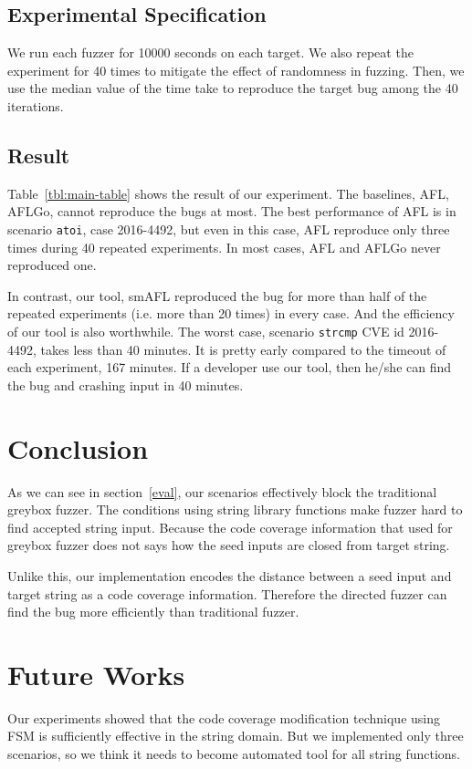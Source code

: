 \documentclass[12pt]{sigplanconf}
\begin{document}
\subsection{Experimental Specification}
We run each fuzzer for 10000 seconds on each target.
We also repeat the experiment for 40 times to mitigate the effect of randomness in fuzzing.
Then, we use the median value of the time take to reproduce the target bug among the 40 iterations.

\subsection{Result}
Table~\ref{tbl:main-table} shows the result of our experiment. The baselines, AFL, AFLGo, cannot reproduce the bugs at most.
The best performance of AFL is in scenario \verb|atoi|, case 2016-4492, but even in this case, AFL reproduce only three
times during 40 repeated experiments. In most cases, AFL and AFLGo never reproduced one.

In contrast, our tool, smAFL reproduced the bug for more than half of the repeated experiments (i.e. more than 20 times)
in every case. And the efficiency of our tool is also worthwhile. The worst case, scenario \verb|strcmp| CVE id 2016-4492,
takes less than 40 minutes. It is pretty early compared to the timeout of each experiment, 167 minutes. If a developer use
our tool, then he/she can find the bug and crashing input in 40 minutes.

\section{Conclusion}
As we can see in section~\ref{eval}, our scenarios effectively block the traditional greybox fuzzer. The conditions using
string library functions make fuzzer hard to find accepted string input. Because the code coverage information that used
for greybox fuzzer does not says how the seed inputs are closed from target string.

Unlike this, our implementation encodes the distance between a seed input and target string as a code coverage information.
Therefore the directed fuzzer can find the bug more efficiently than traditional fuzzer.

\section{Future Works}
Our experiments showed that the code coverage modification technique using FSM is sufficiently effective in the string
domain. But we implemented only three scenarios, so we think it needs to become automated tool for all string functions.



\end{document}
